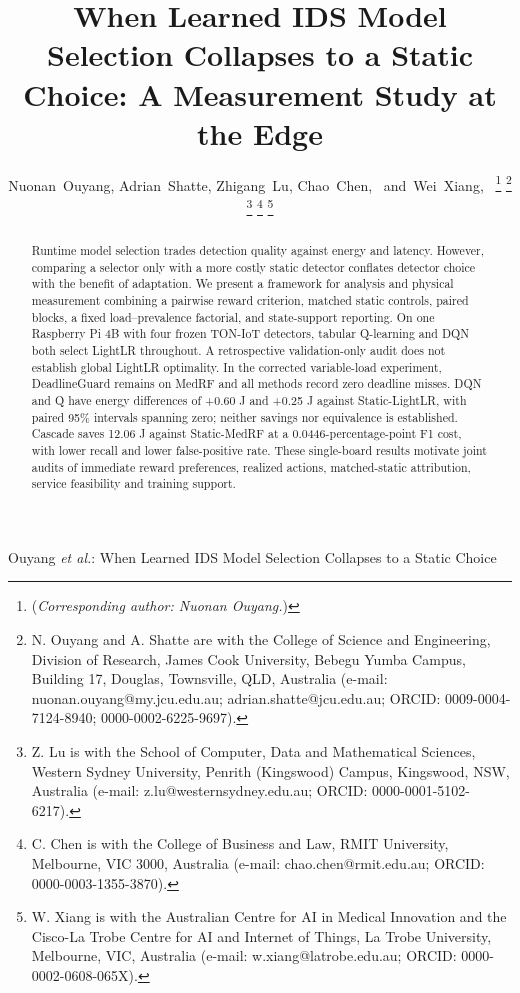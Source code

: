 \documentclass[journal]{IEEEtran}
\begin{document}
\title{When Learned IDS Model Selection Collapses to a Static Choice: A Measurement Study at the Edge}
\author{Nuonan~Ouyang,
        Adrian~Shatte,
        Zhigang~Lu,
        Chao~Chen,~
        and~Wei~Xiang,~%
\thanks{(\textit{Corresponding author: Nuonan Ouyang.})}%
\thanks{N. Ouyang and A. Shatte are with the College of Science and Engineering, Division of Research, James Cook University, Bebegu Yumba Campus, Building 17, Douglas, Townsville, QLD, Australia (e-mail: nuonan.ouyang@my.jcu.edu.au; adrian.shatte@jcu.edu.au; ORCID: 0009-0004-7124-8940; 0000-0002-6225-9697).}%
\thanks{Z. Lu is with the School of Computer, Data and Mathematical Sciences, Western Sydney University, Penrith (Kingswood) Campus, Kingswood, NSW, Australia (e-mail: z.lu@westernsydney.edu.au; ORCID: 0000-0001-5102-6217).}%
\thanks{C. Chen is with the College of Business and Law, RMIT University, Melbourne, VIC 3000, Australia (e-mail: chao.chen@rmit.edu.au; ORCID: 0000-0003-1355-3870).}%
\thanks{W. Xiang is with the Australian Centre for AI in Medical Innovation and the Cisco-La Trobe Centre for AI and Internet of Things, La Trobe University, Melbourne, VIC, Australia (e-mail: w.xiang@latrobe.edu.au; ORCID: 0000-0002-0608-065X).}%
}
%
{Ouyang \MakeLowercase{\textit{et al.}}: When Learned IDS Model Selection Collapses to a Static Choice}
\maketitle
\begin{abstract}
Runtime model selection trades detection quality against energy and latency. However, comparing a selector only with a more costly static detector conflates detector choice with the benefit of adaptation. We present a framework for analysis and physical measurement combining a pairwise reward criterion, matched static controls, paired blocks, a fixed load--prevalence factorial, and state-support reporting. On one Raspberry Pi 4B with four frozen TON-IoT detectors, tabular Q-learning and DQN both select LightLR throughout. A retrospective validation-only audit does not establish global LightLR optimality. In the corrected variable-load experiment, DeadlineGuard remains on MedRF and all methods record zero deadline misses. DQN and Q have energy differences of +0.60 J and +0.25 J against Static-LightLR, with paired 95\% intervals spanning zero; neither savings nor equivalence is established. Cascade saves 12.06 J against Static-MedRF at a 0.0446-percentage-point F1 cost, with lower recall and lower false-positive rate. These single-board results motivate joint audits of immediate reward preferences, realized actions, matched-static attribution, service feasibility and training support.

\end{abstract}
\end{document}
